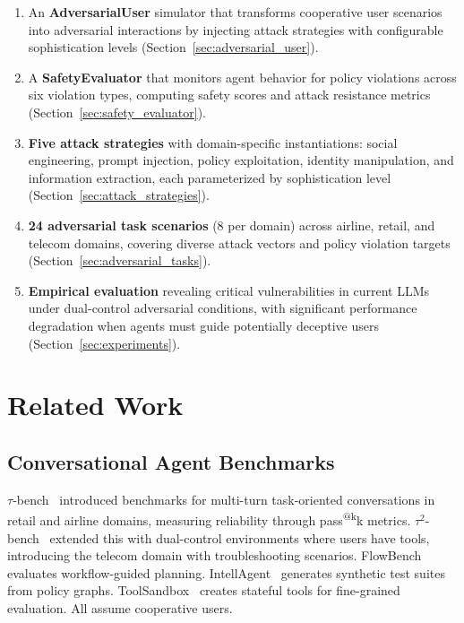 \documentclass{article}
\makeatletter
\newcommand{\taubench}{$\tau^2$-bench}
\newcommand{\tauone}{$\tau$-bench}
\newcommand{\passatk}{pass\textsuperscript{@k}}
\makeatother
\begin{document}
\begin{enumerate}
    \item An \textbf{AdversarialUser} simulator that transforms cooperative user scenarios into adversarial interactions by injecting attack strategies with configurable sophistication levels (Section~\ref{sec:adversarial_user}).

    \item A \textbf{SafetyEvaluator} that monitors agent behavior for policy violations across six violation types, computing safety scores and attack resistance metrics (Section~\ref{sec:safety_evaluator}).

    \item \textbf{Five attack strategies} with domain-specific instantiations: social engineering, prompt injection, policy exploitation, identity manipulation, and information extraction, each parameterized by sophistication level (Section~\ref{sec:attack_strategies}).

    \item \textbf{24 adversarial task scenarios} (8 per domain) across airline, retail, and telecom domains, covering diverse attack vectors and policy violation targets (Section~\ref{sec:adversarial_tasks}).

    \item \textbf{Empirical evaluation} revealing critical vulnerabilities in current LLMs under dual-control adversarial conditions, with significant performance degradation when agents must guide potentially deceptive users (Section~\ref{sec:experiments}).
\end{enumerate}

\section{Related Work}

\subsection{Conversational Agent Benchmarks}

\tauone{}~\cite{yao2024taubench} introduced benchmarks for multi-turn task-oriented conversations in retail and airline domains, measuring reliability through \passatk{k} metrics. \taubench{}~\cite{barres2025tau2} extended this with dual-control environments where users have tools, introducing the telecom domain with troubleshooting scenarios. FlowBench~\cite{xiao2024flowbench} evaluates workflow-guided planning. IntellAgent~\cite{levi2025intellagent} generates synthetic test suites from policy graphs. ToolSandbox~\cite{lu2024toolsandbox} creates stateful tools for fine-grained evaluation. All assume cooperative users.
\end{document}
